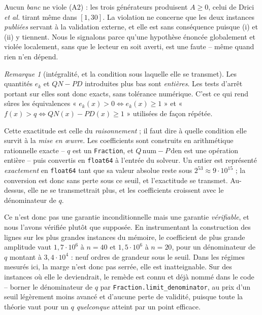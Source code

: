 \documentclass[11pt,a4paper]{article}
\theoremstyle{plain}
\theoremstyle{remark}
\newtheorem{remark}{Remarque}
\begin{document}
\noindent
Aucun \emph{banc} ne viole (A2) : les trois générateurs produisent
$A\ge 0$, celui de Drici \emph{et al.} tirant même dans $[1,30]$. La
violation ne concerne que les deux instances \emph{publiées} servant à la
validation externe, et elle est sans conséquence puisque
(i) et (ii) y tiennent. Nous le signalons parce qu'une hypothèse énoncée
globalement et violée localement, sans que le lecteur en soit averti, est
une faute -- même quand rien n'en dépend.

\begin{remark}[intégralité, et la condition sous laquelle elle se transmet]
\label{rem:int}
Les quantités $e_k$ et $QN-PD$ introduites plus bas sont \emph{entières}.
Les tests d'arrêt portant sur elles sont donc exacts, sans tolérance
numérique. C'est ce qui rend sûres les équivalences
« $e_k(x)>0 \iff e_k(x)\ge 1$ » et « $f(x)>q \iff QN(x)-PD(x)\ge 1$ »
utilisées de façon répétée.

Cette exactitude est celle du \emph{raisonnement} ; il faut dire à quelle
condition elle survit à la \emph{mise en {\oe}uvre}. Les coefficients sont
construits en arithmétique rationnelle exacte -- $q$ est un
\texttt{Fraction}, et $Q\,\text{num}-P\,\text{den}$ est une opération
entière -- puis convertis en \texttt{float64} à l'entrée du solveur. Un
entier est représenté \emph{exactement} en \texttt{float64} tant que sa
valeur absolue reste sous $2^{53}\approx 9\cdot 10^{15}$ ; la conversion
est donc sans perte sous ce seuil, et l'exactitude se transmet. Au-dessus,
elle ne se transmettrait plus, et les coefficients croissent avec le
dénominateur de $q$.

Ce n'est donc pas une garantie inconditionnelle mais une garantie
\emph{vérifiable}, et nous l'avons vérifiée plutôt que supposée. En
instrumentant la construction des lignes sur les plus grandes instances du
mémoire, le coefficient de plus grande amplitude vaut $1{,}7\cdot 10^{6}$
à $n=40$ et $1{,}5\cdot 10^{6}$ à $n=20$, pour un dénominateur de $q$
montant à $3{,}4\cdot 10^{4}$ : neuf ordres de grandeur sous le seuil.
Dans les régimes mesurés ici, la marge n'est donc pas serrée, elle est
inatteignable. Sur des instances où elle le deviendrait, le remède est
connu et déjà nommé dans le code -- borner le dénominateur de $q$ par
\texttt{Fraction.limit\_denominator}, au prix d'un seuil légèrement moins
avancé et d'aucune perte de validité, puisque toute la théorie vaut pour
un $q$ \emph{quelconque} atteint par un point efficace.
\end{remark}
\end{document}
